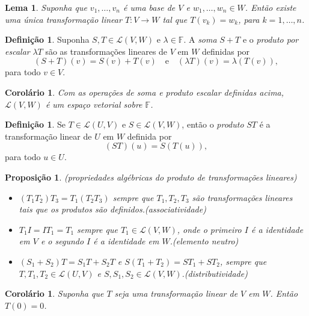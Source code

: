 \documentclass[12pt]{article}
\theoremstyle{plain}
\newtheorem{prop}[thm]{Proposição}
\newtheorem{lem}[thm]{Lema}
\newtheorem{cor}[thm]{Corolário}
\theoremstyle{definition}
\newtheorem{defn}[thm]{Definição}
\theoremstyle{remark}
\begin{document}
\begin{lem}
    Suponha que \(v_1,\ldots,v_n\) é uma base de \(V\) e \(w_1,\ldots,w_n \in W\). Então existe uma única transformação linear \(T: V \to W\) tal que \(T(v_k) = w_k\), para \(k = 1, \ldots, n\).
\end{lem}

\begin{defn}
    Suponha \(S, T \in \mathcal{L}(V, W)\) e \(\lambda \in \mathbb{F}\). A \emph{soma} \(S + T\) e o \emph{produto por escalar} \(\lambda T\) são as transformações lineares de \(V\) em \(W\) definidas por
    \[
        (S + T)(v) = S(v) + T(v) \quad \text{e} \quad (\lambda T)(v) = \lambda (T(v)),
    \]
    \noindent para todo \(v \in V\).
\end{defn}

\begin{cor}
    Com as operações de soma e produto escalar definidas acima, \(\mathcal{L}(V, W)\) é um espaço vetorial sobre \(\mathbb{F}\).
\end{cor}

\begin{defn}
    Se \(T \in \mathcal{L}(U, V)\) e \(S \in \mathcal{L}(V, W)\), então o \emph{produto} \(ST\) é a transformação linear de \(U\) em \(W\) definida por
    \[
        (ST)(u) = S(T(u)),
    \]
    \noindent para todo \(u \in U\).
\end{defn}

\begin{prop} (propriedades algébricas do produto de transformações lineares)
    \begin{itemize}
        \item \(\left(T_1 T_2\right)T_3 = T_1\left(T_2T_3\right)\) sempre que \(T_1, T_2, T_3\) são transformações lineares tais que os produtos são definidos.\hfill\emph{(associatividade)}
        \item \(T_1I = IT_1 = T_1\) sempre que \(T_1 \in \mathcal{L}(V, W)\), onde o primeiro \(I\) é a identidade em \(V\) e o segundo \(I\) é a identidade em \(W\).\hfill\emph{(elemento neutro)}
        \item \(\left(S_1 + S_2\right)T = S_1T + S_2T\) e \(S\left(T_1 + T_2\right) = ST_1 + ST_2\), sempre que \(T, T_1, T_2 \in \mathcal{L}(U, V)\) e \(S, S_1, S_2 \in \mathcal{L}(V, W)\).\hfill\emph{(distributividade)}
    \end{itemize}
\end{prop}

\begin{cor}
    Suponha que \(T\) seja uma transformação linear de \(V\) em \(W\). Então \(T(0) = 0\).
\end{cor}
\end{document}
